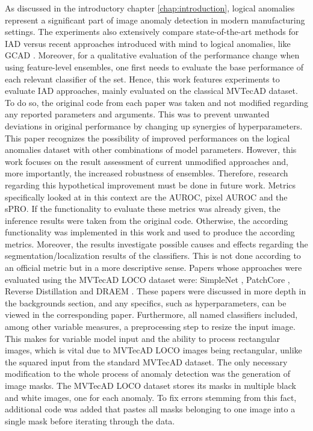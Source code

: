 As discussed in the introductory chapter \ref{chap:introduction}, logical anomalies represent a significant part of image anomaly detection in modern
manufacturing settings. The experiments also extensively compare state-of-the-art methods for IAD versus recent approaches  
introduced with mind to logical anomalies, like GCAD \cite{LOCODentsAndScratchesBergmann2022}. 
Moreover, for a qualitative evaluation of the performance change when using feature-level ensembles, one first needs to evaluate the base performance 
of each relevant classifier of the set. 
Hence, this work features experiments to evaluate IAD approaches, mainly evaluated on the classical MVTecAD dataset. To do so, the original 
code from each paper was taken and not modified regarding any reported parameters and arguments. This was to prevent unwanted deviations 
in original performance by changing up synergies of hyperparameters. This paper recognizes the possibility of improved performances on the logical anomalies dataset 
with other combinations of model parameters. However, this work focuses on the result assessment of current unmodified approaches and, more importantly, the increased robustness of ensembles. Therefore, research regarding this hypothetical improvement must be done in future work. Metrics specifically looked at in this context are the AUROC, pixel AUROC and the sPRO. 
If the functionality to evaluate these metrics was already given, the inference results were taken from the original code. Otherwise, the according functionality 
was implemented in this work and used to produce the according metrics. Moreover, the results investigate possible causes and effects regarding the segmentation/localization results of the 
classifiers. This is not done according to an official metric but in a more descriptive sense.
Papers whose approaches were evaluated using the MVTecAD LOCO dataset were: SimpleNet \cite{liu2023simplenet}, PatchCore \cite{patchCore2022}, Reverse Distillation \cite{revdist2023} and DRAEM \cite{Zavrtanik_2021DRAEM}. 
These papers were discussed in more depth in the backgrounds section, and any specifics, such as 
hyperparameters, can be viewed in the corresponding paper. Furthermore, all named classifiers included, among other variable measures, 
a preprocessing step to resize the input image. This makes for variable model input and the ability to process rectangular images, 
which is vital due to MVTecAD LOCO images being rectangular, unlike the squared input from the standard MVTecAD dataset. The only 
necessary modification to the whole process of anomaly detection was the generation of image masks. The MVTecAD LOCO dataset stores its 
masks in multiple black and white images, one for each anomaly. To fix errors stemming from this fact, additional 
code was added that pastes all masks belonging to one image into a single mask before iterating through the data. 




